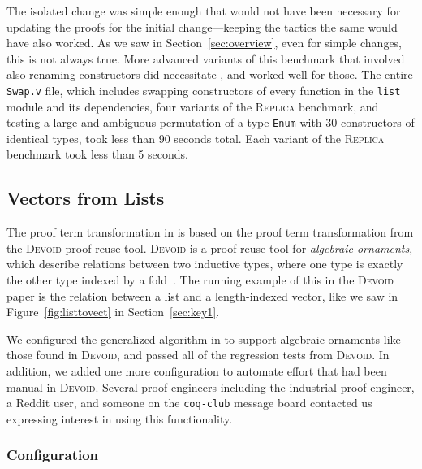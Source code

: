 The isolated change was simple enough that \toolname would not have been necessary
for updating the proofs for the initial change---keeping the tactics the same would have also worked.
As we saw in Section~\ref{sec:overview}, even for simple changes, this is not always true.
More advanced variants of this benchmark that involved also renaming constructors did necessitate \toolname,
and \toolname worked well for those. %
The entire \lstinline{Swap.v} file, which includes swapping constructors of every function in the \lstinline{list} module and
its dependencies, four variants of the \textsc{Replica} benchmark,
and testing a large and ambiguous permutation of a type \lstinline{Enum} with 30 constructors of identical types,
took \toolname less than 90 seconds total. %
Each variant of the \textsc{Replica} benchmark took \toolname less than 5 seconds. %

\subsection{Vectors from Lists}
\label{sec:dep}

The proof term transformation in \toolname is based on the proof term transformation from
the \textsc{Devoid} proof reuse tool.
\textsc{Devoid} is a proof reuse tool for \textit{algebraic ornaments}, which describe relations
between two inductive types, where one type is exactly the other type indexed by a fold~\cite{mcbride}.
The running example of this in the \textsc{Devoid} paper is the relation between a list and a
length-indexed vector, like we saw in Figure~\ref{fig:listtovect} in Section~\ref{sec:key1}.

We configured the generalized algorithm in \toolname to support algebraic ornaments like those found in \textsc{Devoid},
and passed all of the regression tests from \textsc{Devoid}.
In addition, we added one more configuration to automate effort that had been manual in \textsc{Devoid}.
Several proof engineers including the industrial proof engineer, a Reddit user,
and someone on the \lstinline{coq-club} message board contacted us expressing interest in using this functionality.

\subsubsection{Configuration}

